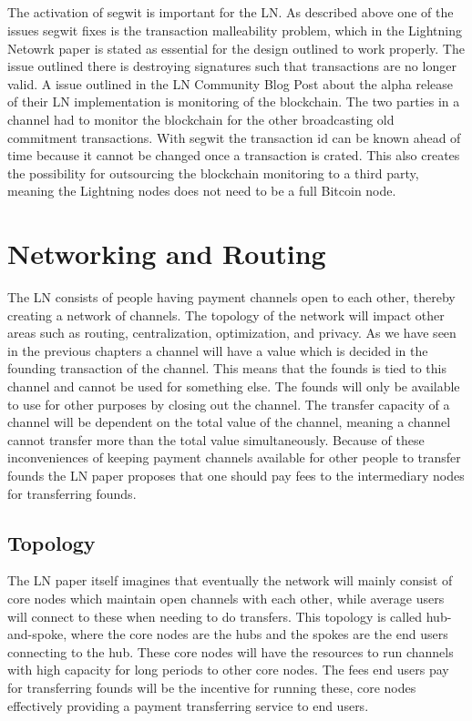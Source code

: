 \documentclass[informationsecurity]{gucmasterproject}
\begin{document}
\paragraph{}
The activation of segwit is important for the LN. As described above one of the issues segwit fixes is the transaction malleability problem, which in the Lightning Netowrk paper \cite{poon2015bitcoin} is stated as essential for the design outlined to work properly. The issue outlined there is destroying signatures such that transactions are no longer valid. A issue outlined in the LN Community Blog Post\cite{LN_segwit} about the alpha release of their LN implementation is monitoring of the blockchain. The two parties in a channel had to monitor the blockchain for the other broadcasting old commitment transactions. With segwit the transaction id can be known ahead of time because it cannot be changed once a transaction is crated. This also creates the possibility for outsourcing the blockchain monitoring to a third party, meaning the Lightning nodes does not need to be a full Bitcoin node.

\chapter{Networking and Routing}

The LN consists of people having payment channels open to each other, thereby creating a network of channels. The topology of the network will impact other areas such as routing, centralization, optimization, and privacy.  As we have seen in the previous chapters a channel will have a value which is decided in the founding transaction of the channel. This means that  the founds is tied to this channel and cannot be used for something else. The founds will only be available to use for other purposes by closing out the channel. The transfer capacity of a channel will be dependent on the total value of the channel, meaning a channel cannot transfer more than the total value simultaneously. Because of these inconveniences of keeping payment channels available for other people to transfer founds the LN paper\cite{poon2015bitcoin} proposes that one should pay fees to the intermediary nodes for transferring founds. 

\section{Topology}
The LN paper itself\cite{poon2015bitcoin} imagines that eventually the network will mainly consist of core nodes which maintain open channels with each other, while average users will connect to these when needing to do transfers. This topology is called hub-and-spoke, where the core nodes are the hubs and the spokes are the end users connecting to the hub. These core nodes will have the resources to run channels with high capacity for long periods to other core nodes. The fees end users pay for transferring founds will be the incentive for running these, core nodes effectively providing a payment transferring service to end users. 
\end{document}
